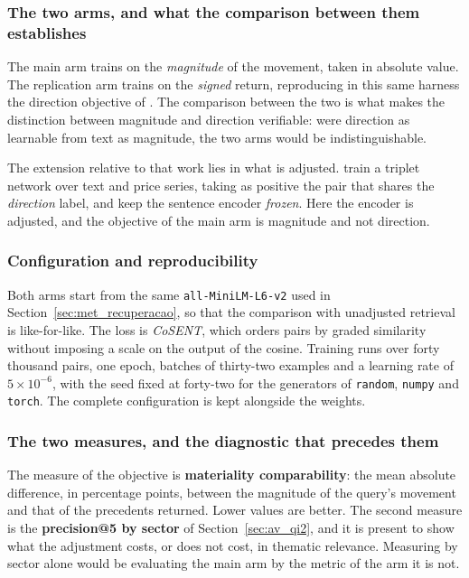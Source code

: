 \subsubsection*{The two arms, and what the comparison between them establishes}

The main arm trains on the \emph{magnitude} of the movement, taken in absolute value. The
replication arm trains on the \emph{signed} return, reproducing in this same harness the
direction objective of \textcite{du2024contrastive}. The comparison between the two is what
makes the
distinction between magnitude and direction verifiable: were direction as learnable from text as
magnitude, the two arms would be indistinguishable.

The extension relative to that work lies in what is adjusted. \textcite{du2024contrastive}
train a triplet network over text and price series, taking as positive the pair that shares
the \emph{direction} label, and keep the sentence encoder \emph{frozen}. Here the encoder is
adjusted, and the objective of the main arm is magnitude and not direction.

\subsubsection*{Configuration and reproducibility}

Both arms start from the same \texttt{all-MiniLM-L6-v2} used in
Section~\ref{sec:met_recuperacao}, so that the comparison with unadjusted retrieval is
like-for-like. The loss is \emph{CoSENT}, which orders pairs by graded similarity without
imposing a scale on the output of the cosine. Training runs over forty thousand pairs, one epoch,
batches of thirty-two examples and a learning rate of $5 \times 10^{-6}$, with the seed fixed at
forty-two for the generators of \texttt{random}, \texttt{numpy} and \texttt{torch}. The complete
configuration is kept alongside the weights.

\subsubsection*{The two measures, and the diagnostic that precedes them}

The measure of the objective is \textbf{materiality comparability}: the mean absolute difference,
in percentage points, between the magnitude of the query's movement and that of the precedents
returned. Lower values are better. The second measure is the \textbf{precision@5 by sector} of
Section~\ref{sec:av_qi2}, and it is present to show what the adjustment costs, or does
not cost, in thematic relevance. Measuring by sector alone would be evaluating the main arm by
the metric of the arm it is not.

